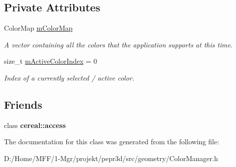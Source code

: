 \subsection*{Private Attributes}
\begin{DoxyCompactItemize}
\item 
\mbox{\label{classpepr3d_1_1_color_manager_ad6b9cb7395ea796012aec61e6292cdfd}} 
Color\+Map \mbox{\hyperlink{classpepr3d_1_1_color_manager_ad6b9cb7395ea796012aec61e6292cdfd}{m\+Color\+Map}}
\begin{DoxyCompactList}\small\item\em A vector containing all the colors that the application supports at this time. \end{DoxyCompactList}\item 
\mbox{\label{classpepr3d_1_1_color_manager_a29706f2b1a4d4870f4d9398c4830f9ec}} 
size\+\_\+t \mbox{\hyperlink{classpepr3d_1_1_color_manager_a29706f2b1a4d4870f4d9398c4830f9ec}{m\+Active\+Color\+Index}} = 0
\begin{DoxyCompactList}\small\item\em Index of a currently selected / active color. \end{DoxyCompactList}\end{DoxyCompactItemize}
\subsection*{Friends}
\begin{DoxyCompactItemize}
\item 
\mbox{\label{classpepr3d_1_1_color_manager_ab2f44cbb59a08132f4c843e5225bba0e}} 
class {\bfseries cereal\+::access}
\end{DoxyCompactItemize}


The documentation for this class was generated from the following file\+:\begin{DoxyCompactItemize}
\item 
D\+:/\+Home/\+M\+F\+F/1-\/\+Mgr/projekt/pepr3d/src/geometry/Color\+Manager.\+h\end{DoxyCompactItemize}
